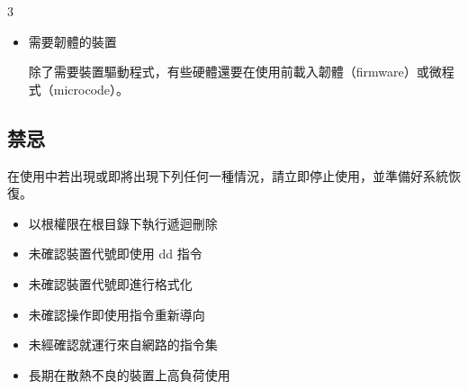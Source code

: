 \documentclass{article}
\begin{document}
\begin{multicols*}{3}
\begin{itemize}[leftmargin=*]
		基於您的需求，也許可以使用低於上表所列的設定完成系統安裝。但是多數用戶在無視這些建議的情況下會安裝失敗。

		\item 需要韌體的裝置

		除了需要裝置驅動程式，有些硬體還要在使用前載入韌體（firmware）或微程式（microcode）。

	\end{itemize}


	\begin{tcolorbox}
	\section*{禁忌}
	\end{tcolorbox}

	在使用中若出現或即將出現下列任何一種情況，請立即停止使用，並準備好系統恢復。

	\begin{itemize}[leftmargin=*]
		\setlength{\itemsep}{0pt}
		\setlength{\parskip}{0pt}
		\setlength{\parsep}{0pt}

		\item 以根權限在根目錄下執行遞迴刪除
		\item 未確認裝置代號即使用 dd 指令
		\item 未確認裝置代號即進行格式化
		\item 未確認操作即使用指令重新導向
		\item 未經確認就運行來自網路的指令集
		\item 長期在散熱不良的裝置上高負荷使用
	\end{itemize}








\end{multicols*}
\end{document}
